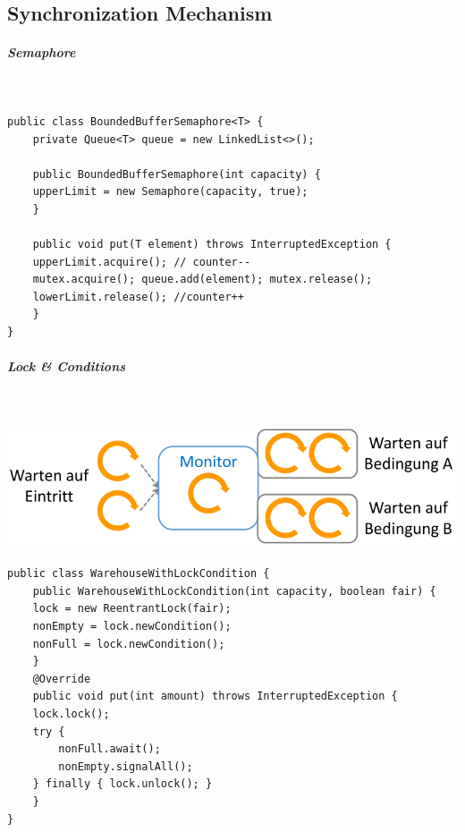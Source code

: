 \documentclass[8pt,twoside,landscape]{extarticle}
\begin{document}
\begin{multicols}{5}
\section{Synchronization Mechanism}
\label{sec:org2f3b625}
\subparagraph{Semaphore} \
\label{sec:org4b5704f}
\lstset{language=java,label= ,caption= ,captionpos=b,numbers=none}
\begin{lstlisting}
public class BoundedBufferSemaphore<T> {
    private Queue<T> queue = new LinkedList<>();

    public BoundedBufferSemaphore(int capacity) {
	upperLimit = new Semaphore(capacity, true);
    }

    public void put(T element) throws InterruptedException {
	upperLimit.acquire(); // counter--
	mutex.acquire(); queue.add(element); mutex.release();
	lowerLimit.release(); //counter++
    }
}
\end{lstlisting}
\subparagraph{Lock \& Conditions} \
\label{sec:org34e6cab}
{
\begin{center}
\includegraphics[width=.9\linewidth]{img/lock_and_conditions.png}
\end{center}
\captionof{figure}{Lock & Conditions}\label{fig:lock-and-conditions}
}

\lstset{language=java,label= ,caption= ,captionpos=b,numbers=none}
\begin{lstlisting}
public class WarehouseWithLockCondition {
    public WarehouseWithLockCondition(int capacity, boolean fair) {
	lock = new ReentrantLock(fair);
	nonEmpty = lock.newCondition();
	nonFull = lock.newCondition();
    }
    @Override
    public void put(int amount) throws InterruptedException {
	lock.lock();
	try {
	    nonFull.await();
	    nonEmpty.signalAll();
	} finally { lock.unlock(); }
    }
}
\end{lstlisting}


\end{multicols}
\end{document}

